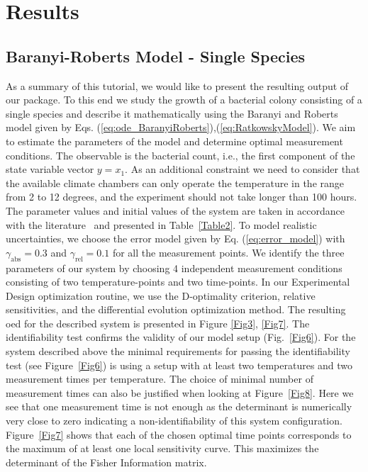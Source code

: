 \documentclass[graybox]{svmult}
\begin{document}
\section*{Results}
\subsection*{Baranyi-Roberts Model - Single Species}
As a summary of this tutorial, we would like to present the resulting output of our package.
To this end we study the growth of a bacterial colony consisting of a single species and describe it mathematically using the Baranyi and Roberts model given by Eqs. (\ref{eq:ode_BaranyiRoberts}),(\ref{eq:RatkowskyModel}).
We aim to estimate the parameters of the model and determine optimal measurement conditions.
The observable is the bacterial count, i.e., the first component of the state variable vector $y = x_1$.
As an additional constraint we need to consider that the available climate chambers can only operate the temperature in the range from 2 to 12 degrees, and the experiment should not take longer than 100 hours.
The parameter values and initial values of the system are taken in accordance with the literature~\cite{gospavic_mathematical_2008} and presented in Table~\ref{Table2}.
%
To model realistic uncertainties, we choose the error model given by Eq. (\ref{eq:error_model}) with $\gamma_\text{abs}=0.3$ and $\gamma_\text{rel}=0.1$ for all the measurement points.
We identify the three parameters of our system by choosing 4 independent measurement conditions consisting of two temperature-points and two time-points.
In our Experimental Design optimization routine, we use the D-optimality criterion, relative sensitivities, and the differential evolution optimization method.
The resulting \ac{oed} for the described system is presented in Figure \ref{Fig3}, \ref{Fig7}.
The identifiability test confirms the validity of our model setup (Fig.~\ref{Fig6}).
%
%
For the system described above the minimal requirements for passing the identifiability test (see Figure~\ref{Fig6}) is using a setup with at least two temperatures and two measurement times per temperature.
The choice of minimal number of measurement times can also be justified when looking at Figure~\ref{Fig8}.
Here we see that one measurement time is not enough as the determinant is numerically very close to zero indicating a non-identifiability of this system configuration.
%
%
Figure~\ref{Fig7} shows that each of the chosen optimal time points corresponds to the maximum of at least one local sensitivity curve.
This maximizes the determinant of the Fisher Information matrix.
%
%
%
\end{document}
